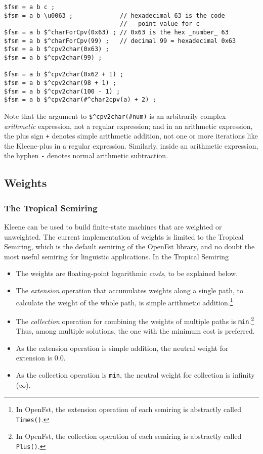 \begin{Verbatim}
$fsm = a b c ;
$fsm = a b \u0063 ;             // hexadecimal 63 is the code 
                                //   point value for c
$fsm = a b $^charForCpv(0x63) ; // 0x63 is the hex _number_ 63
$fsm = a b $^charForCpv(99) ;   // decimal 99 = hexadecimal 0x63
$fsm = a b $^cpv2char(0x63) ;
$fsm = a b $^cpv2char(99) ;

$fsm = a b $^cpv2char(0x62 + 1) ;
$fsm = a b $^cpv2char(98 + 1) ;
$fsm = a b $^cpv2char(100 - 1) ;
$fsm = a b $^cpv2char(#^char2cpv(a) + 2) ;
\end{Verbatim}

\noindent
Note that the argument to \verb!$^cpv2char(#num)! is an arbitrarily complex 
\emph{arithmetic} expression, not a regular expression;
and in an arithmetic expression, the plus sign \verb!+! denotes simple arithmetic addition, not one or more
iterations like the Kleene-plus in a regular expression.  Similarly, inside an
arithmetic expression, the hyphen \texttt{-} denotes normal arithmetic subtraction.


\subsection{Weights}

\subsubsection{The Tropical Semiring}  

Kleene can be used to build finite-state machines that are weighted or unweighted.
The current implementation of weights is limited to the
Tropical Semiring, which is the default semiring of the OpenFst library, and no doubt
the most useful semiring for linguistic applications.
In the Tropical Semiring

\begin{itemize}
\item
The weights are floating-point logarithmic \emph{costs}, to be explained below.
\item
The \emph{extension} operation that accumulates weights along a single
path, to calculate the weight of the whole path, is simple arithmetic addition.\footnote{In OpenFst, the extension operation of
each
semiring is abstractly called \texttt{Times()}.}
\item
The \emph{collection} operation for combining the weights of multiple
paths is \texttt{min}.\footnote{In OpenFst, the collection
operation of each semiring is abstractly called \texttt{Plus()}.}
Thus, among multiple solutions, the one with the minimum cost is preferred.
\item
As the extension operation is simple addition, the neutral weight for extension is 0.0.  
\item
As the collection operation is \texttt{min}, the neutral weight for collection is infinity ($\infty$).
\end{itemize}

